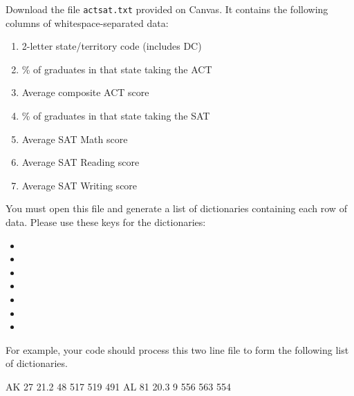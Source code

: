 \documentclass[11pt]{cselabheader}
\begin{document}
\begin{ex}[readscores.py]
  Download the file \texttt{actsat.txt} provided on Canvas. It contains the
  following columns of whitespace-separated data:

  \begin{enumerate}
    \item 2-letter state/territory code (includes DC)
    \item \% of graduates in that state taking the ACT
    \item Average composite ACT score
    \item \% of graduates in that state taking the SAT
    \item Average SAT Math score
    \item Average SAT Reading score
    \item Average SAT Writing score
  \end{enumerate}

  You must open this file and generate a list of dictionaries containing each
  row of data. Please use these keys for the dictionaries:
  \begin{multicols}{3}
  \begin{itemize}
  \item {}
  \item {}
  \item {}
  \item {}
  \item {}
  \item {}
  \item {}
  \end{itemize}
  \end{multicols}

  For example, your code should process this two line file to 
  form the following list of dictionaries.

  \begin{verbatimcode}
AK        27 21.2    48      517        519                491
AL      81     20.3   9   556          563     554   
  \end{verbatimcode}

  \begin{python3code}
  \end{python3code}
\end{ex}

\printindex


\end{document}
